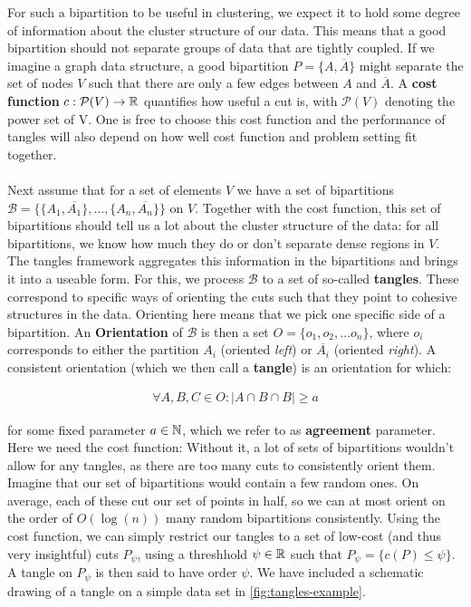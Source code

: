 For such a bipartition to be useful in clustering, we expect it to hold some degree of information about the cluster 
structure of our data. This means that a good bipartition should not separate groups of data that are tightly coupled.
If we imagine a graph data structure, a good bipartition $P = \{A, \overline{A}\}$ might separate the set of nodes $V$ such that there 
are only a few edges between $A$ and $\overline{A}$. A \textbf{cost function} 
$c: \mathcal{P}(V) \to \mathbb{R}$ quantifies how useful a cut is, with $\mathcal{P}(V)$ denoting the power set of V. One is free to choose this cost function and the performance of tangles will also depend on
how well cost function and problem setting fit together. \\
\\
Next assume that for a set of elements $V$ we have a set of bipartitions $\mathcal{B} = \{\{A_1, \overline{A_1}\}, \ldots, \{A_n, \overline{A_n}\} \} $ on $V$.
Together with the cost function, this set of bipartitions should tell us a lot about the cluster structure of the data:
for all bipartitions, we know how much they do or don't separate dense regions in $V$. The tangles framework aggregates
this information in the bipartitions and brings it into a useable form. For this, we process $\mathcal{B}$ to a set of so-called \textbf{tangles}. These
correspond to specific ways of orienting the cuts such that they point to cohesive structures in the data. 
Orienting here means that we pick one specific side of a bipartition. An \textbf{Orientation} of $\mathcal{B}$ is then a set $O = \{o_1, o_2, \ldots o_n\}$, where $o_i$ 
corresponds to either the partition $A_i$ (oriented \textit{left}) or $\overline{A_i}$ (oriented \textit{right}). A consistent orientation (which we then call a \textbf{tangle}) is an orientation for which:

\begin{align}
    \forall A,B,C \in O: \left| A \cap B \cap B \right| \ge a
\end{align}

for some fixed parameter $a \in \mathbb{N}$, which we refer to as \textbf{agreement} parameter. Here we need the cost function: Without it, a lot of
sets of bipartitions wouldn't allow for any tangles, as there are too many cuts to consistently orient them. Imagine that our set of bipartitions would 
contain a few random ones. On average, each of these cut our set of points in half, so we can at most orient on the order of $O(\log(n))$ many random bipartitions consistently.
Using the cost function, we can simply restrict our tangles to a set of low-cost (and thus very insightful) cuts $P_{\psi}$, using a threshhold $\psi \in \mathbb{R}$ such that
$P_{\psi} = \{ c(P) \le \psi \}$. A tangle on $P_{\psi}$ is then said to have order $\psi$. We have included a schematic drawing of a tangle on a simple data set in \autoref{fig:tangles-example}.


